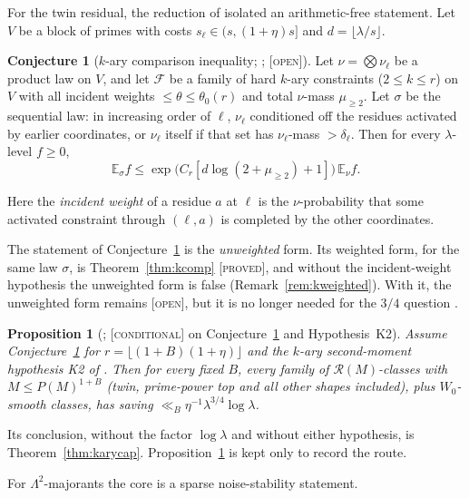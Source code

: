 \documentclass[10pt,reqno]{amsart}
\newtheorem{proposition}[theorem]{Proposition}
\theoremstyle{definition}
\newtheorem{conjecture}[theorem]{Conjecture}
\theoremstyle{remark}
\newcommand{\cR}{\mathscr R}
\newcommand{\E}{\mathbb E}
\newcommand{\lab}[1]{\textup{[\textsc{#1}]}}
\begin{document}
For the twin residual, the reduction of \cite[\S6]{TW} isolated an
arithmetic-free statement.  Let $V$ be a block of primes with costs
$s_\ell\in(s,(1+\eta)s]$ and $d=\lfloor\lambda/s\rfloor$.

\begin{conjecture}[$k$-ary comparison inequality; {\cite[Conj.~6.4]{TW}}; \lab{open}]\label{conj:kary}
Let $\nu=\bigotimes\nu_\ell$ be a product law on $V$, and let $\mathcal F$ be a
family of hard $k$-ary constraints ($2\leq k\leq r$) on $V$ with all incident
weights $\leq\theta\leq\theta_0(r)$ and total $\nu$-mass $\mu_{\geq2}$.  Let
$\sigma$ be the sequential law: in increasing order of $\ell$, $\nu_\ell$
conditioned off the residues activated by earlier coordinates, or $\nu_\ell$
itself if that set has $\nu_\ell$-mass $>\delta_\ell$.  Then for every
$\lambda$-level $f\geq0$,
\[
 \E_\sigma f\leq\exp\bigl(C_r[d\log(2+\mu_{\geq2})+1]\bigr)\,\E_\nu f.
\]
\end{conjecture}
Here the \emph{incident weight} of a residue $a$ at $\ell$ is the
$\nu$-probability that some activated constraint through $(\ell,a)$ is
completed by the other coordinates.

The statement of Conjecture~\ref{conj:kary} is the \emph{unweighted}
form.  Its weighted form, for the same law $\sigma$, is
Theorem~\ref{thm:kcomp} \lab{proved}, and without the incident-weight
hypothesis the unweighted form is false (Remark~\ref{rem:kweighted}).
With it, the unweighted form remains \lab{open}, but it is no longer
needed for the $3/4$ question \cite[\S5]{KA}.

\begin{proposition}[{\cite[Prop.~6.5]{TW}}; \lab{conditional} on Conjecture~\ref{conj:kary} and Hypothesis~K2]\label{prop:twinconditional}
Assume Conjecture~\ref{conj:kary} for $r=\lfloor(1+B)(1+\eta)\rfloor$ and the
$k$-ary second-moment hypothesis K2 of \cite[\S6.3]{TW}.  Then for every
fixed $B$, every family of $\cR(M)$-classes with $M\leq P(M)^{1+B}$ (twin,
prime-power top and all other shapes included), plus $W_0$-smooth classes,
has saving $\ll_B\eta^{-1}\lambda^{3/4}\log\lambda$.
\end{proposition}
Its conclusion, without the factor $\log\lambda$ and without either
hypothesis, is Theorem~\ref{thm:karycap}.  Proposition~\ref{prop:twinconditional}
is kept only to record the route.

For $\Lambda^2$-majorants the core is a sparse noise-stability statement.
\end{document}
